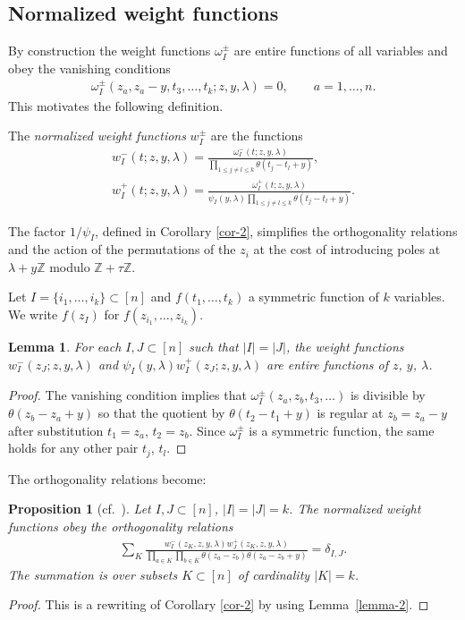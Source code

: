 \documentclass[10pt,a4paper]{amsart}
\numberwithin{equation}{section}
\newtheorem{Lemma}[Theorem]{Lemma}
\newtheorem{Proposition}[Theorem]{Proposition}
 { \theoremstyle{definition}
\newtheorem{Definition}[Theorem]{Definition}
\newtheorem{Example}[Theorem]{Example}
\newtheorem{Remark}[Theorem]{Remark} }
\begin{document}
 \subsection{Normalized weight functions}\label{ss-3.9}
 By construction the weight functions $\omega^\pm_I$ are entire functions of all variables and obey the vanishing conditions
 \begin{gather*}
 \omega^\pm_I(z_a,z_a-y,t_3,\dots,t_k;z,y,\lambda)=0, \qquad a=1,\dots,n.
 \end{gather*}
 This motivates the following definition.
 \begin{Definition}
 The {\em normalized weight functions} $w_I^\pm$ are the functions
 \begin{gather*}
 w_I^-(t;z,y,\lambda) =\frac{\omega^-_I(t;z,y,\lambda)}{\prod\limits_{1\leq j\neq l\leq k}\theta(t_j-t_l+y)},\\
 w_I^+(t;z,y,\lambda) = \frac{\omega^+_I(t;z,y,\lambda)}{\psi_I(y,\lambda) \prod\limits_{1\leq j\neq l\leq k}\theta(t_j-t_l+y)}.
 \end{gather*}
 \end{Definition}
 \begin{Remark} The factor $1/\psi_I$, defined in Corollary \ref{cor-2}, simplifies the orthogonality relations and the action of the permutations of the $z_i$ at the cost of introducing poles at $\lambda+y\mathbb Z$ modulo
 $\mathbb Z+\tau\mathbb Z$.
 \end{Remark}
 Let $I=\{i_1,\dots,i_k\}\subset[n]$ and $f(t_1,\dots,t_k)$ a symmetric function of $k$ variables. We write $f(z_I)$ for $f(z_{i_1},\dots,z_{i_k})$.
 \begin{Lemma}\label{lemma-4} For each $I,J\subset[n]$ such that $|I|=|J|$, the weight functions $w_I^-(z_J;z,y,\lambda)$ and $\psi_I(y,\lambda) w_I^+(z_J;z,y,\lambda)$ are entire functions of $z$, $y$, $\lambda$.
 \end{Lemma}
 \begin{proof} The vanishing condition implies that $\omega_I^\pm(z_a,z_b,t_3,\dots)$ is divisible by $\theta(z_b-z_a+y)$ so that the quotient by $\theta(t_2-t_1+y)$ is regular at $z_b=z_a-y$ after substitution $t_1=z_a$, $t_2=z_b$. Since $\omega_I^\pm$ is a symmetric function, the same holds for any other pair $t_j$, $t_l$.
 \end{proof}
 The orthogonality relations become:
 \begin{Proposition}[cf.~\cite{RTV,RTV2,RV2}]\label{p-ortho} Let $I,J\subset[n]$, $|I|=|J|=k$. The normalized weight functions obey the orthogonality relations
 \begin{gather*}
 \sum_{K}\frac{w^-_I(z_K,z,y,\lambda)w^+_J(z_K,z,y,\lambda)} {\prod\limits_{a\in K}\prod\limits_{b\in\bar K}\theta(z_a-z_b)\theta(z_a-z_b+y)} =\delta_{I,J}.
 \end{gather*}
 The summation is over subsets $K\subset[n]$ of cardinality $|K|=k$.
\end{Proposition}
\begin{proof} This is a rewriting of Corollary \ref{cor-2} by using Lemma~\ref{lemma-2}.
\end{proof}
\end{document}
